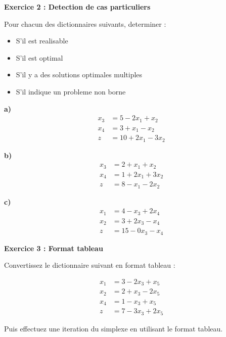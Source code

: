 \documentclass[12pt,a4paper]{article}
\begin{document}
\begin{exemple}
\textbf{Exercice 2 : Detection de cas particuliers}

Pour chacun des dictionnaires suivants, determiner :
\begin{itemize}
    \item S'il est realisable
    \item S'il est optimal
    \item S'il y a des solutions optimales multiples
    \item S'il indique un probleme non borne
\end{itemize}

\textbf{a)} 
\begin{align*}
x_3 &= 5 - 2x_1 + x_2\\
x_4 &= 3 + x_1 - x_2\\
z &= 10 + 2x_1 - 3x_2
\end{align*}

\textbf{b)} 
\begin{align*}
x_3 &= 2 + x_1 + x_2\\
x_4 &= 1 + 2x_1 + 3x_2\\
z &= 8 - x_1 - 2x_2
\end{align*}

\textbf{c)} 
\begin{align*}
x_1 &= 4 - x_3 + 2x_4\\
x_2 &= 3 + 2x_3 - x_4\\
z &= 15 - 0x_3 - x_4
\end{align*}
\end{exemple}

\newpage
\begin{exemple}
\textbf{Exercice 3 : Format tableau}

Convertissez le dictionnaire suivant en format tableau :

\begin{align*}
x_1 &= 3 - 2x_3 + x_5\\
x_2 &= 2 + x_3 - 2x_5\\
x_4 &= 1 - x_3 + x_5\\
z &= 7 - 3x_3 + 2x_5
\end{align*}

Puis effectuez une iteration du simplexe en utilisant le format tableau.
\end{exemple}
\end{document}
